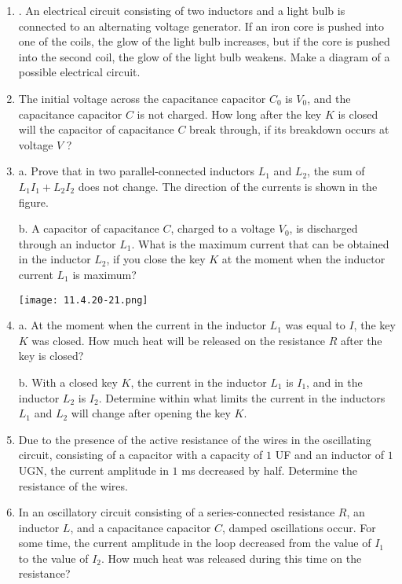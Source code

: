 \documentclass{article}
\begin{document}
\begin{enumerate}[label=11.4.\arabic*]
\item. An electrical circuit consisting of two inductors and a light bulb is connected to an alternating voltage generator. If an iron core is pushed into one of the coils, the glow of the light bulb increases, but if the core is pushed into the second coil, the glow of the light bulb weakens. Make a diagram of a possible electrical circuit.

\item The initial voltage across the capacitance capacitor $C_0$ is $V_0$, and the capacitance capacitor $C$ is not charged. How long after the key $K$ is closed will the capacitor of capacitance $C$ break through, if its breakdown occurs at voltage $V$ ?

\item a. Prove that in two parallel-connected inductors $L_1$ and $L_2$, the sum of $L_1I_1 + L_2I_2$ does not change. The direction of the currents is shown in the figure. 

b. A capacitor of capacitance $C$, charged to a voltage $V_0$, is discharged through an inductor $L_1$. What is the maximum current that can be obtained in the inductor $L_2$, if you close the key $K$ at the moment when the inductor current $L_1$ is maximum?

\begin{center}
    \texttt{[image: 11.4.20-21.png]}
\end{center}

\item a. At the moment when the current in the inductor $L_1$ was equal to $I$, the key $K$ was closed. How much heat will be released on the resistance $R$ after the key is closed? 

b. With a closed key $K$, the current in the inductor $L_1$ is $I_1$, and in the inductor $L_2$ is $I_2$. Determine within what limits the current in the inductors $L_1$ and $L_2$ will change after opening the key $K$.

\item Due to the presence of the active resistance of the wires in the oscillating circuit, consisting of a capacitor with a capacity of $1$ UF and an inductor of $1$ UGN, the current amplitude in $1$ ms decreased by half. Determine the resistance of the wires.

\item In an oscillatory circuit consisting of a series-connected resistance $R$, an inductor $L$, and a capacitance capacitor $C$, damped oscillations occur. For some time, the current amplitude in the loop decreased from the value of $I_1$ to the value of $I_2$. How much heat was released during this time on the resistance?


\end{enumerate}
\end{document}
